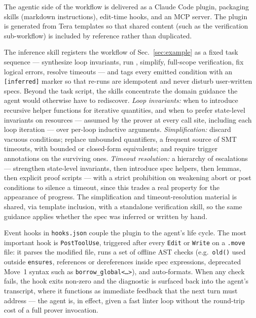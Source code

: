 \label{sec:skills}

The agentic side of the workflow is delivered as a Claude Code plugin, packaging skills (markdown instructions), edit-time hooks, and an MCP server.
The plugin is generated from Tera templates so that shared content (such as the verification sub-workflow) is included by reference rather than duplicated.

The inference skill registers the workflow of Sec.~\ref{sec:example} as a fixed task sequence --- synthesize loop invariants, run \WP, simplify, full-scope verification, fix logical errors, resolve timeouts --- and tags every emitted condition with an \texttt{[inferred]} marker so that re-runs are idempotent and never disturb user-written specs.
Beyond the task script, the skills concentrate the domain guidance the agent would otherwise have to rediscover.
\emph{Loop invariants:} when to introduce recursive helper functions for iterative quantities, and when to prefer state-level invariants on resources --- assumed by the prover at every call site, including each loop iteration --- over per-loop inductive arguments.
\emph{Simplification:} discard vacuous conditions; replace unbounded quantifiers, a frequent source of SMT timeouts, with bounded or closed-form equivalents; and require trigger annotations on the surviving ones.
\emph{Timeout resolution:} a hierarchy of escalations --- strengthen state-level invariants, then introduce spec helpers, then lemmas, then explicit proof scripts --- with a strict prohibition on weakening abort or post conditions to silence a timeout, since this trades a real property for the appearance of progress.
The simplification and timeout-resolution material is shared, via template inclusion, with a standalone verification skill, so the same guidance applies whether the spec was inferred or written by hand.

Event hooks in \texttt{hooks.json} couple the plugin to the agent's life cycle.
The most important hook is \texttt{PostToolUse}, triggered after every \texttt{Edit} or \texttt{Write} on a \texttt{.move} file: it parses the modified file, runs a set of offline AST checks (e.g.\ \texttt{old()} used outside \texttt{ensures}, references or dereferences inside spec expressions, deprecated Move~1 syntax such as \texttt{borrow\_global<\ldots>}), and auto-formats.
When any check fails, the hook exits non-zero and the diagnostic is surfaced back into the agent's transcript, where it functions as immediate feedback that the next turn must address --- the agent is, in effect, given a fast linter loop without the round-trip cost of a full prover invocation.

